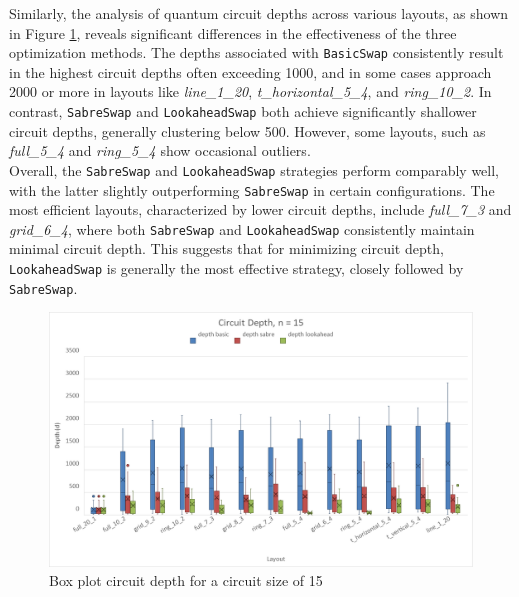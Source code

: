 Similarly, the analysis of quantum circuit depths across various layouts, as shown in Figure \ref{fig:chart-box-plot-depth}, reveals significant differences in the effectiveness of the three optimization methods. The depths associated with \lstinline{BasicSwap} consistently result in the highest circuit depths often exceeding 1000, and in some cases approach 2000 or more in layouts like \textit{line\_1\_20}, \textit{t\_horizontal\_5\_4}, and \textit{ring\_10\_2}. In contrast, \lstinline{SabreSwap} and \lstinline{LookaheadSwap} both achieve significantly shallower circuit depths, generally clustering below 500. However, some layouts, such as \textit{full\_5\_4} and \textit{ring\_5\_4} show occasional outliers. \\
Overall, the \lstinline{SabreSwap} and \lstinline{LookaheadSwap} strategies perform comparably well, with the latter slightly outperforming \lstinline{SabreSwap} in certain configurations. The most efficient layouts, characterized by lower circuit depths, include \textit{full\_7\_3} and \textit{grid\_6\_4}, where both \lstinline{SabreSwap} and \lstinline{LookaheadSwap} consistently maintain minimal circuit depth. This suggests that for minimizing circuit depth, \lstinline{LookaheadSwap} is generally the most effective strategy, closely followed by \lstinline{SabreSwap}.
\begin{figure}[htb]
    \centering
    \includegraphics[width=\linewidth]{image/chart_box_plot_depth.png}
    \caption{Box plot circuit depth for a circuit size of 15}
    \label{fig:chart-box-plot-depth}
\end{figure}

